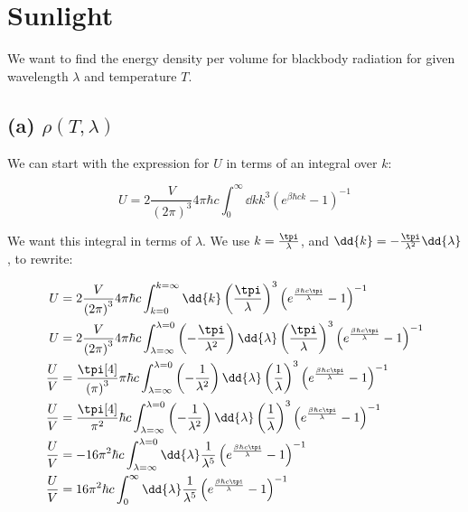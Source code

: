 \documentclass[../../PS3.tex]{subfiles}
\begin{document}
\graphicspath{{images/}{./problems/Prob1/images/}}


\section{Sunlight}

We want to find the energy density per volume for blackbody radiation for given wavelength $\lambda$ and temperature $T$.

\subsection*{(a) $\rho(T, \lambda)$}

We can start with the expression for $U$ in terms of an integral over $k$:

\begin{equation}
	U = 2 \frac{V}{\left(2\pi\right)^3} 4 \pi \hbar c \int_0^\infty \dd{k} k^3 \left(e^{\beta \hbar c k} - 1\right)^{-1}
\end{equation}

We want this integral in terms of $\lambda$. We use $k = \frac{\tpi}{\lambda}$, and $\dd{k} = - \frac{\tpi}{\lambda^2} \dd{\lambda}$, to rewrite:

\begin{align}
	U &= 2 \frac{V}{\left(2\pi\right)^3} 4 \pi \hbar c \int_{k=0}^{k=\infty} \dd{k} \left(\frac{\tpi}{\lambda}\right)^3 \left(e^{ \frac{\beta \hbar c \tpi}{\lambda}} - 1\right)^{-1} \\
	U &=  2 \frac{V}{\left(2\pi\right)^3} 4 \pi \hbar c \int_{\lambda=\infty}^{\lambda = 0} \left(-\frac{\tpi}{\lambda^2}\right) \dd{\lambda} \left(\frac{\tpi}{\lambda}\right)^3 \left(e^{ \frac{\beta \hbar c \tpi}{\lambda}} - 1\right)^{-1} \\
	\frac{U}{V} &=   \frac{\tpi[4]}{\left(\pi\right)^3}  \pi \hbar c \int_{\lambda=\infty}^{\lambda = 0} \left(-\frac{1}{\lambda^2}\right) \dd{\lambda} \left(\frac{1}{\lambda}\right)^3 \left(e^{ \frac{\beta \hbar c \tpi}{\lambda}} - 1\right)^{-1} \\
	\frac{U}{V} &= \frac{\tpi[4]}{\pi^2}   \hbar c \int_{\lambda=\infty}^{\lambda = 0} \left(-\frac{1}{\lambda^2}\right) \dd{\lambda} \left(\frac{1}{\lambda}\right)^3 \left(e^{ \frac{\beta \hbar c \tpi}{\lambda}} - 1\right)^{-1} \\
	\frac{U}{V} &= - 16 \pi^2 \hbar c \int_{\lambda=\infty}^{\lambda = 0}  \dd{\lambda} \frac{1}{\lambda^5} \left(e^{ \frac{\beta \hbar c \tpi}{\lambda}} - 1\right)^{-1} \\
	\frac{U}{V} &= 16 \pi^2 \hbar c \int_{0}^{\infty}  \dd{\lambda} \frac{1}{\lambda^5} \left(e^{ \frac{\beta \hbar c \tpi}{\lambda}} - 1\right)^{-1}
\end{align}
\end{document}
